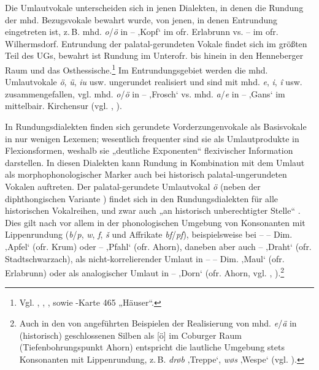 Die Umlautvokale unterscheiden sich in jenen Dialekten, in denen die Rundung der mhd. Bezugsvokale bewahrt wurde, von jenen, in denen Entrundung eingetreten ist, z.\,B. mhd. \textit{o}/\textit{ö} in  --  ‚Kopf‘ im ofr. Erlabrunn vs.  --  im ofr. Wilhermsdorf. Entrundung der palatal-gerundeten Vokale findet sich im größten Teil des UGs, bewahrt ist Rundung im Unterofr. bis hinein in den Henneberger Raum und das Osthessische.\footnote{Vgl. \citet[67--68 und Karte 13]{Rowley1997}, \citet[204--208]{Schirmunski1962}, \citet[41--43 und Karten 22/31]{Steger1968}, \citet[1103]{Wiesinger1983e} sowie \citealt{WA}-Karte 465 „Häuser“.} Im Entrundungsgebiet werden die mhd. Umlautvokale \textit{ö}, \textit{ü}, \textit{iu} usw. ungerundet realisiert und sind mit mhd. \textit{e}, \textit{i}, \textit{î} usw. zusammengefallen, vgl. mhd. \textit{o}/\textit{ö} in  --  ‚Frosch‘ vs. mhd. \textit{a}/\textit{e} in  --  ‚Gans‘ im mittelbair. Kirchensur (vgl. \citealt[§4a4]{Kranzmayer1956}, \citealt[1102]{Wiesinger1983e}).

In Rundungsdialekten finden sich gerundete Vorderzungenvokale als Basisvokale in nur wenigen Lexemen; wesentlich frequenter sind sie als Umlautprodukte in Flexionsformen, weshalb sie „deutliche Exponenten“ \citep[68]{Rowley1997} flexivischer Information darstellen. In diesen Dialekten kann Rundung in Kombination mit dem Umlaut als morphophonologischer Marker auch bei historisch palatal-ungerundeten Vokalen auftreten. Der palatal-gerundete Umlautvokal \textit{ö} (neben der diphthongischen Variante ) findet sich in den Rundungsdialekten für alle historischen Vokalreihen, und zwar auch „an historisch unberechtigter Stelle“ \citep[68]{Rowley1997}. Dies gilt nach \citet[1103]{Wiesinger1983e} vor allem in der phonologischen Umgebung von Konsonanten mit Lippenrundung (\textit{b}/\textit{p}, \textit{w}, \textit{f}, \textit{š} und Affrikate \textit{bf}/\textit{pf}), beispielsweise bei  --  -- Dim.  ‚Apfel‘ (ofr. Krum) oder   --  ‚Pfahl‘ (ofr. Ahorn), daneben aber auch  --  ‚Draht‘ (ofr. Stadtschwarzach), als nicht-korrelierender Umlaut in  --  -- Dim.  ‚Maul‘ (ofr. Erlabrunn) oder als analogischer Umlaut in  --  ‚Dorn‘ (ofr. Ahorn, vgl. \citealt[88--89]{Kemmeter1924}, \citealt[42]{Steger1968}).\footnote{Auch in den von \citet[30]{Niederlöhner1937} angeführten Beispielen der Realisierung von mhd. \textit{e}/\textit{ä} in (historisch) geschlossenen Silben als [ö] im Coburger Raum (Tiefenbohrungspunkt Ahorn) entspricht die lautliche Umgebung stets Konsonanten mit Lippenrundung, z.\,B. \textit{drøb} ‚Treppe‘, \textit{wøs} ‚Wespe‘ (vgl. \citealt[44]{Koß1967}).}


